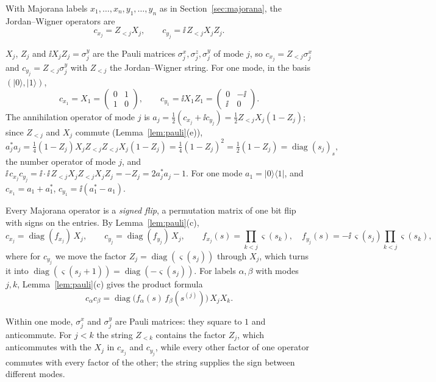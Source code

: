 \begin{definition}\label{def:majorana}
With Majorana labels $x_1,\ldots,x_n,y_1,\ldots,y_n$ as in Section~\ref{sec:majorana},
the Jordan--Wigner operators are
\[
 c_{x_j}=Z_{<j}X_j,\qquad c_{y_j}=\ii\,Z_{<j}X_jZ_j .
\]
\end{definition}
$X_j$, $Z_j$ and $\ii X_jZ_j=\sigma^y_j$ are the Pauli matrices $\sigma^x_j,\sigma^z_j,\sigma^y_j$
of mode $j$, so $c_{x_j}=Z_{<j}\sigma^x_j$ and $c_{y_j}=Z_{<j}\sigma^y_j$ with $Z_{<j}$ the
Jordan--Wigner string.
For one mode, in the basis $(|0\rangle,|1\rangle)$,
\[
 c_{x_1}=X_1=\begin{pmatrix}0&1\\1&0\end{pmatrix},\qquad
 c_{y_1}=\ii X_1Z_1=\begin{pmatrix}0&-\ii\\ \ii&0\end{pmatrix}.
\] The annihilation operator of mode $j$ is
$a_j=\tfrac12(c_{x_j}+\ii c_{y_j})=\tfrac12Z_{<j}X_j(1-Z_j)$; since $Z_{<j}$ and $X_j$ commute
(Lemma~\ref{lem:pauli}(e)),
\[
 a_j^*a_j=\tfrac14(1-Z_j)X_jZ_{<j}Z_{<j}X_j(1-Z_j)=\tfrac14(1-Z_j)^2=\tfrac12(1-Z_j)
 =\operatorname{diag}(s_j)_s ,
\]
the number operator of mode $j$, and
$\ii\,c_{x_j}c_{y_j}=\ii\cdot\ii\,Z_{<j}X_jZ_{<j}X_jZ_j=-Z_j=2a_j^*a_j-1$. For one mode
$a_1=|0\rangle\langle1|$, and $c_{x_1}=a_1+a_1^*$, $c_{y_1}=\ii(a_1^*-a_1)$.

Every Majorana operator is a \emph{signed flip}, a permutation matrix of one bit flip with signs on the entries. By Lemma~\ref{lem:pauli}(c),
\begin{equation}\label{eq:signed-flip}
 c_{x_j}=\operatorname{diag}(f_{x_j})\,X_j,\qquad c_{y_j}=\operatorname{diag}(f_{y_j})\,X_j,
 \qquad
 f_{x_j}(s)=\prod_{k<j}\varsigma(s_k),\quad
 f_{y_j}(s)=-\ii\,\varsigma(s_j)\prod_{k<j}\varsigma(s_k),
\end{equation}
where for $c_{y_j}$ we move the factor $Z_j=\operatorname{diag}(\varsigma(s_j))$ through
$X_j$, which turns it into $\operatorname{diag}(\varsigma(s_j+1))=\operatorname{diag}(-\varsigma(s_j))$.
For labels $\alpha,\beta$ with modes
$j,k$, Lemma~\ref{lem:pauli}(c) gives the product formula
\begin{equation}\label{eq:product}
 c_\alpha c_\beta=\operatorname{diag}\bigl(f_\alpha(s)\,f_\beta(s^{(j)})\bigr)\,X_jX_k .
\end{equation}

Within one mode, $\sigma^x_j$ and $\sigma^y_j$ are Pauli matrices: they square to $1$ and
anticommute. For $j<k$ the string $Z_{<k}$ contains the factor $Z_j$, which anticommutes with
the $X_j$ in $c_{x_j}$ and $c_{y_j}$, while every other factor of one operator commutes with
every factor of the other; the string supplies the sign between different modes.

